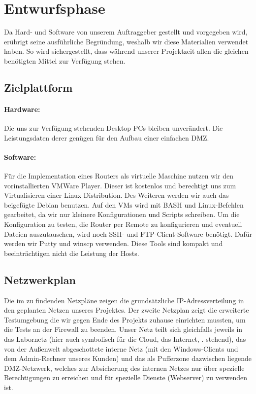 \section{Entwurfsphase} 
\label{sec:Entwurfsphase}
Da Hard- und Software von unserem Auftraggeber gestellt und vorgegeben wird, erübrigt seine ausführliche Begründung, weshalb wir diese Materialien verwendet haben. So wird sichergestellt, dass während unserer Projektzeit allen die gleichen benötigten Mittel zur Verfügung stehen.

\subsection{Zielplattform}
\label{sec:Zielplattform}

\paragraph*{Hardware: } 
Die uns zur Verfügung stehenden Desktop \ac{PC}s bleiben unverändert. Die Leistungsdaten derer  genügen für den Aufbau einer einfachen \ac{DMZ}.

\paragraph*{Software: } 
Für die Implementation eines Routers als virtuelle Maschine nutzen wir den vorinstallierten VMWare Player. Dieser ist kostenlos und berechtigt uns zum Virtualisieren einer Linux Distribution. Des Weiteren werden wir auch das beigefügte Debian benutzen. Auf den \ac{VM}s wird mit \ac{BASH} und Linux-Befehlen gearbeitet, da wir nur kleinere Konfigurationen und Scripts schreiben. Um die Konfiguration zu testen, die Router per Remote zu konfigurieren und eventuell Dateien auszutauschen, wird noch \ac{SSH}- und \ac{FTP}-Client-Software benötigt. Dafür werden wir Putty und winscp verwenden. Diese Tools sind kompakt und beeinträchtigen nicht die Leistung der Hosts.

\subsection{Netzwerkplan}
\label{sec:Geschaeftslogik}

Die im  zu findenden Netzpläne zeigen die grundsätzliche \ac{IP}-Adressverteilung in den geplanten Netzen unseres Projektes.
Der zweite Netzplan zeigt die erweiterte Testumgebung die wir gegen Ende des Projekts zuhause einrichten mussten, um die Tests an der Firewall zu beenden. 
Unser Netz teilt sich gleichfalls jeweils in das Labornetz (hier auch symbolisch für die Cloud, das Internet, \etc. stehend), das von der Außenwelt abgeschottete interne Netz (mit den Windows-Clients und dem Admin-Rechner unseres Kunden) und das als Pufferzone dazwischen liegende \ac{DMZ}-Netzwerk, welches zur Absicherung des internen Netzes nur über spezielle Berechtigungen zu erreichen und für spezielle Dienste (Webserver) zu verwenden ist.

